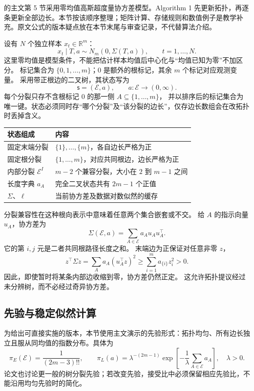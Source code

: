 \documentclass[UTF8,11pt,fontset=fandol,openany,oneside]{ctexbook}
\theoremstyle{definition}
\theoremstyle{remark}
\numberwithin{equation}{chapter}
\begin{document}
\citet{S16} 的主文第 5 节采用零均值高斯超度量协方差模型。Algorithm 1 先更新拓扑，再逐条更新全部边长。本节按该顺序整理；矩阵计算、存储规则和数值例子是教学补充。原文公式的版本疑点放在本节末尾与审查记录，不代替算法介绍。

设有 $N$ 个独立样本 $x_t\in\mathbb R^m$：
\[
 x_t\mid T,a\sim N_m(0,\Sigma(T,a)),\qquad t=1,\ldots,N.
\]
这里零均值是模型条件，不能把估计样本均值后中心化与“均值已知为零”不加区分。
标记集合为 $\{0,1,\ldots,m\}$；$0$ 是额外的根标记，其余 $m$ 个标记对应观测变量。
采用带正根边的二叉树，其状态写为
\[
 \mathsf s=(\mathcal E,a),\qquad
 a:\mathcal E\longrightarrow(0,\infty).
\]
每个分裂只存不含根标记 $0$ 的那一侧 $A\subseteq\{1,\ldots,m\}$，
并以排序后的标记集合为唯一键。状态必须同时存“哪个分裂”及“该分裂的边长”，仅存边长数组会在改拓扑时丢掉含义。

\begin{center}
\begin{tabularx}{\linewidth}{lX}
\toprule
状态组成 & 内容\\
\midrule
固定末端分裂 & $\{1\},\ldots,\{m\}$，各自边长严格为正\\
固定根分裂 & $\{1,\ldots,m\}$，对应共同根边，边长严格为正\\
内部分裂 $\mathcal E^I$ & $m-2$ 个兼容分裂，大小在 $2$ 到 $m-1$ 之间\\
长度字典 $a_A$ & 完全二叉状态共有 $2m-1$ 个正值\\
$\Sigma$、$\ell$ & 当前协方差及数据对数似然的缓存\\
\bottomrule
\end{tabularx}
\end{center}

分裂兼容性在这种根向表示中意味着任意两个集合嵌套或不交。
给 $A$ 的指示向量 $u_A$，协方差为
\begin{equation}
 \Sigma(\mathcal E,a)=\sum_{A\in\mathcal E}a_Au_Au_A^\top.
 \label{eq:textbook-S16-sigma}
\end{equation}
它的第 $i,j$ 元是二者共同根路径长度之和。
末端边为正保证对任意非零 $z$，
\[
 z^\top\Sigma z
 =\sum_Aa_A(u_A^\top z)^2
 \ge\sum_{i=1}^m a_{\{i\}}z_i^2>0.
\]
因此，即使暂时将某条内部边收缩到零，协方差仍然正定。
这允许拓扑提议经过未分辨树，而不必经过奇异协方差。

\subsection{先验与稳定似然计算}

为给出可直接实施的版本，本节使用主文演示的先验形式：拓扑均匀、所有边长独立且服从同均值的指数分布。具体为
\[
 \pi_E(\mathcal E)=\frac1{(2m-3)!!},\qquad
 \pi_L(a)=\lambda^{-(2m-1)}
 \exp\!\left[-\frac1\lambda\sum_{A\in\mathcal E}a_A\right],
 \quad \lambda>0.
\]
论文也讨论更一般的树分裂先验；若改变先验，接受比中必须保留相应先验比，不能沿用均匀先验时的简化。
\end{document}
